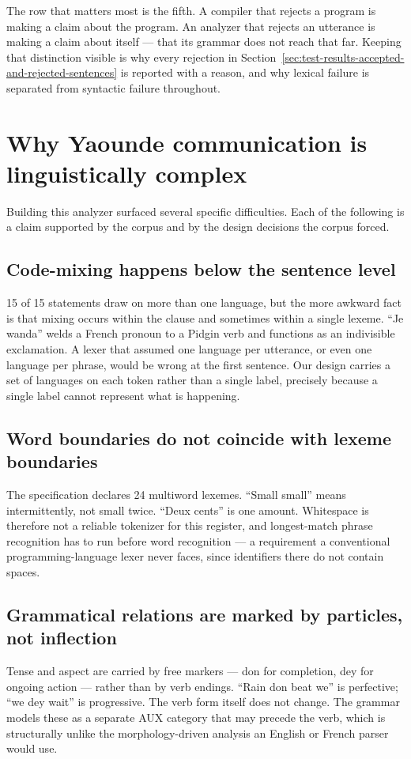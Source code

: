 \documentclass[11pt,a4paper]{article}
\begin{document}
The row that matters most is the fifth. A compiler that rejects a program is making a claim about the program. An analyzer that rejects an utterance is making a claim about itself --- that its grammar does not reach that far. Keeping that distinction visible is why every rejection in Section~\ref{sec:test-results-accepted-and-rejected-sentences} is reported with a reason, and why lexical failure is separated from syntactic failure throughout.

\section{Why Yaounde communication is linguistically complex}
\label{sec:why-yaounde-communication-is-linguistically-complex}
Building this analyzer surfaced several specific difficulties. Each of the following is a claim supported by the corpus and by the design decisions the corpus forced.

\subsection{Code-mixing happens below the sentence level}
15 of 15 statements draw on more than one language, but the more awkward fact is that mixing occurs within the clause and sometimes within a single lexeme. ``Je wanda'' welds a French pronoun to a Pidgin verb and functions as an indivisible exclamation. A lexer that assumed one language per utterance, or even one language per phrase, would be wrong at the first sentence. Our design carries a set of languages on each token rather than a single label, precisely because a single label cannot represent what is happening.

\subsection{Word boundaries do not coincide with lexeme boundaries}
The specification declares 24 multiword lexemes. ``Small small'' means intermittently, not small twice. ``Deux cents'' is one amount. Whitespace is therefore not a reliable tokenizer for this register, and longest-match phrase recognition has to run before word recognition --- a requirement a conventional programming-language lexer never faces, since identifiers there do not contain spaces.

\subsection{Grammatical relations are marked by particles, not inflection}
Tense and aspect are carried by free markers --- don for completion, dey for ongoing action --- rather than by verb endings. ``Rain don beat we'' is perfective; ``we dey wait'' is progressive. The verb form itself does not change. The grammar models these as a separate AUX category that may precede the verb, which is structurally unlike the morphology-driven analysis an English or French parser would use.
\end{document}
